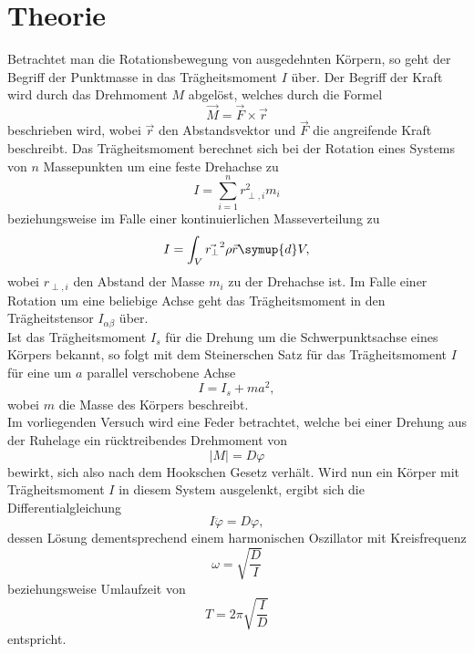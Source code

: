 \section{Theorie}
\label{sec:Theorie}
Betrachtet man die Rotationsbewegung von ausgedehnten Körpern, so geht der Begriff der Punktmasse in das Trägheitsmoment $I$ über.
Der Begriff der Kraft wird durch das Drehmoment $M$ abgelöst, welches durch die Formel
\begin{equation}
  \vec{M} = \vec{F} \times \vec{r}
\end{equation}
beschrieben wird, wobei $\vec{r}$ den Abstandsvektor und $\vec{F}$ die angreifende Kraft beschreibt.
Das Trägheitsmoment berechnet sich bei der Rotation eines Systems von $n$ Massepunkten um eine feste Drehachse zu
\begin{equation}
  I = \sum_{i=1}^n r_{\perp, i}^2 m_i
  \label{eqn:tm1}
\end{equation}
beziehungsweise im Falle einer kontinuierlichen Masseverteilung zu
\begin{equation}
  I = \int_V^{} \vec{r_{\perp}}^2 \rho{\vec{r}} \symup{d}V,
  \label{eqn:tm2}
\end{equation}
wobei $r_{\perp, i}$ den Abstand der Masse $m_i$ zu der Drehachse ist.
Im Falle einer Rotation um eine beliebige Achse geht das Trägheitsmoment in den Trägheitstensor $I_{\alpha \beta}$ über.\\
Ist das Trägheitsmoment $I_s$ für die Drehung um die Schwerpunktsachse eines Körpers bekannt, so folgt mit dem Steinerschen Satz für das Trägheitsmoment $I$ für eine um $a$ parallel verschobene Achse
\begin{equation}
  I = I_s + m a^2,
  \label{eqn:steiner}
\end{equation}
wobei $m$ die Masse des Körpers beschreibt.\\
Im vorliegenden Versuch wird eine Feder betrachtet, welche bei einer Drehung aus der Ruhelage ein rücktreibendes Drehmoment von
\begin{equation}
  \lvert M \rvert = D \varphi
\end{equation}
bewirkt, sich also nach dem Hookschen Gesetz verhält.
Wird nun ein Körper mit Trägheitsmoment $I$ in diesem System ausgelenkt, ergibt sich die Differentialgleichung
\begin{equation}
  I \ddot{\varphi} = D \varphi,
\end{equation}
dessen Lösung dementsprechend einem harmonischen Oszillator mit Kreisfrequenz
\begin{equation}
  \omega = \sqrt{\frac{D}{I}}
\end{equation}
beziehungsweise Umlaufzeit von
\begin{equation}
  T = 2 \pi \sqrt{\frac{I}{D}} \label{eqn:zeiten}
\end{equation}
entspricht.

